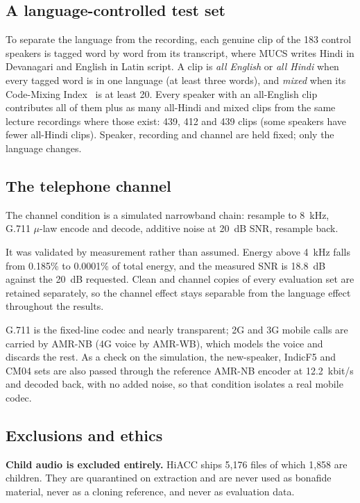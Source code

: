 \subsection{A language-controlled test set}
\label{sec:data-control}

To separate the language from the recording, each genuine clip of the 183 control
speakers is tagged word by word from its transcript, where MUCS writes Hindi in
Devanagari and English in Latin script. A clip is \emph{all English} or \emph{all
Hindi} when every tagged word is in one language (at least three words), and
\emph{mixed} when its Code-Mixing Index~\cite{das2014cmi} is at least 20. Every
speaker with an all-English clip contributes all of them plus as many all-Hindi and
mixed clips from the same lecture recordings where those exist: 439, 412 and 439 clips
(some speakers have fewer all-Hindi clips). Speaker,
recording and channel are held fixed; only the language changes.

\subsection{The telephone channel}

The channel condition is a simulated narrowband chain: resample to 8~kHz, G.711
$\mu$-law encode and decode, additive noise at 20~dB SNR, resample back.

It was validated by measurement rather than assumed. Energy above 4~kHz falls from
0.185\% to 0.0001\% of total energy, and the measured SNR is 18.8~dB against the 20~dB
requested.
Clean and channel copies of every evaluation set are retained separately, so the
channel effect stays separable from the language effect throughout the results.

G.711 is the fixed-line codec and nearly transparent; 2G and 3G mobile calls are carried
by AMR-NB (4G voice by AMR-WB), which models the voice and discards the rest. As a check on the simulation, the
new-speaker, IndicF5 and CM04 sets are also passed through the reference AMR-NB
encoder at 12.2~kbit/s and decoded back, with no added noise, so that condition isolates
a real mobile codec.

\subsection{Exclusions and ethics}

\textbf{Child audio is excluded entirely.} HiACC ships 5{,}176 files of which 1{,}858
are children. They are quarantined on extraction and are never used as bonafide
material, never as a cloning reference, and never as evaluation data.

